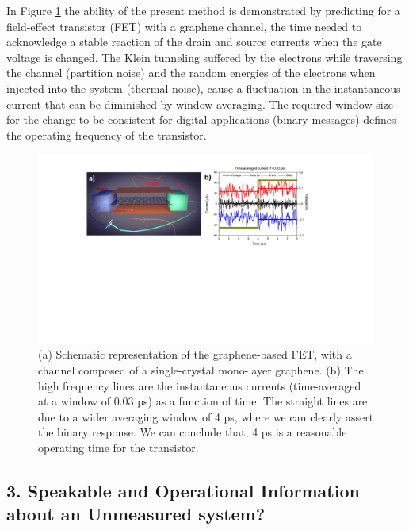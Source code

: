 \documentclass[11pt, a4paper]{article} %
\begin{document}
In Figure \ref{fig:fig} the ability of the present method is demonstrated \cite{inject,Thz} by predicting for a field-effect transistor (FET) with a graphene channel, the time needed to acknowledge a stable reaction of the drain and source currents when the gate voltage is changed. The Klein tunneling suffered by the electrons while traversing the channel (partition noise) and the random energies of the electrons when injected into the system (thermal noise), cause a fluctuation in the instantaneous current that can be diminished by window averaging. The required window size for the change to be consistent for digital applications (binary messages) defines the operating frequency of the transistor.\vspace{-0.2cm}
\begin{figure}[h!]
  \centering
  \hspace*{-0.5cm}
   \includegraphics[width=1\linewidth]{Figures/figurefinal.pdf}\vspace{-0.3cm}
   \caption{(a) Schematic representation of the graphene-based FET, with a channel composed of a single-crystal mono-layer graphene. (b) The high frequency lines are the instantaneous currents (time-averaged at a window of $0.03$ ps) as a function of time. The straight lines are due to a wider averaging window of 4 ps, where we can clearly assert the binary response. We can conclude that, 4 ps is a reasonable operating time for the transistor.}\vspace{-0.4cm}
  \label{fig:fig}
\end{figure}

 
\subsection*{3. Speakable and Operational Information about an Unmeasured system?}
\end{document}
